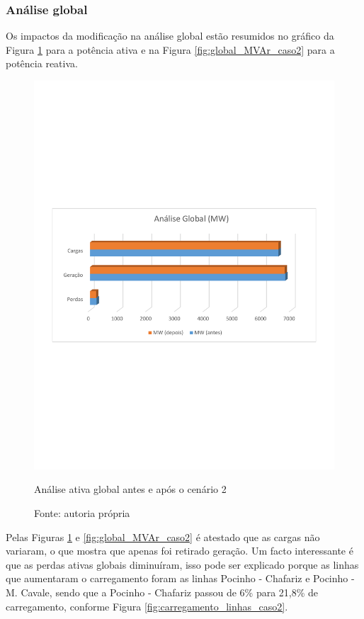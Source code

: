 \subsubsection{Análise global}
Os impactos da modificação na análise global estão resumidos no gráfico da Figura \ref{fig:global_MW_caso2} para a potência ativa e na Figura \ref{fig:global_MVAr_caso2} para a potência reativa.

\begin{figure}[H]
	\centering
	\captionsetup{width=\textwidth, font=footnotesize, textfont=bf}	
	\includegraphics[width=\linewidth,trim = 20mm 97mm 20mm 105mm,clip]{img/global_MW_caso2.pdf}
	\caption{Análise ativa global antes e após o cenário 2}
	\vspace{-3.5mm}
	\caption*{Fonte: autoria própria}
	\label{fig:global_MW_caso2}
\end{figure}

Pelas Figuras \ref{fig:global_MW_caso2} e \ref{fig:global_MVAr_caso2} é atestado que as cargas não variaram, o que mostra que apenas foi retirado geração. Um facto interessante é que as perdas ativas globais diminuíram, isso pode ser explicado porque as linhas que aumentaram o carregamento foram as linhas Pocinho - Chafariz e Pocinho - M. Cavale, sendo que a Pocinho - Chafariz passou de 6\% para 21,8\% de carregamento, conforme Figura \ref{fig:carregamento_linhas_caso2}. 

